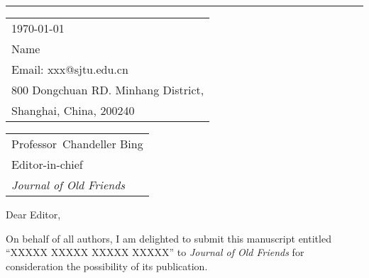 \documentclass{article}
\begin{document}

\vspace{-1em} %

\rule{\linewidth}{1pt} %

\bigskip\bigskip %


\hfill
\begin{tabular}{l @{}}
\hfill \today \bigskip\\ %
\hfill Name \\
\hfill Email: xxx@sjtu.edu.cn \\
\hfill 800 Dongchuan RD. Minhang District,\\
\hfill Shanghai, China, 200240 \\ %
\end{tabular}

\bigskip %


\begin{tabular}{@{} l}
	Professor\ Chandeller Bing \\
	Editor-in-chief \\
	\textit{Journal of Old Friends}
\end{tabular}

\bigskip %

Dear Editor,

\bigskip %


On behalf of all authors, I am delighted to submit this manuscript entitled “XXXXX XXXXX XXXXX XXXXX” to \textit{Journal of Old Friends} for consideration the possibility of its publication.
\end{document}
